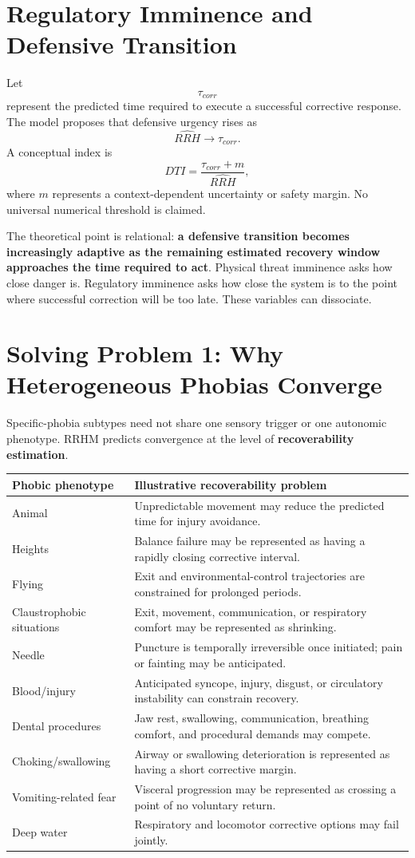 \documentclass[11pt]{article}
\begin{document}
\section{Regulatory Imminence and Defensive Transition}

Let
\[
\tau_{corr}
\]
represent the predicted time required to execute a successful corrective response. The model proposes that defensive urgency rises as
\[
\widehat{RRH}\rightarrow \tau_{corr}.
\]
A conceptual index is
\[
DTI=\frac{\tau_{corr}+m}{\widehat{RRH}},
\]
where $m$ represents a context-dependent uncertainty or safety margin. No universal numerical threshold is claimed.

The theoretical point is relational: \textbf{a defensive transition becomes increasingly adaptive as the remaining estimated recovery window approaches the time required to act}. Physical threat imminence asks how close danger is. Regulatory imminence asks how close the system is to the point where successful correction will be too late. These variables can dissociate.

\section{Solving Problem 1: Why Heterogeneous Phobias Converge}

Specific-phobia subtypes need not share one sensory trigger or one autonomic phenotype. RRHM predicts convergence at the level of \textbf{recoverability estimation}.

\begin{longtable}{p{}p{}}
\toprule
\textbf{Phobic phenotype} & \textbf{Illustrative recoverability problem} \\
\midrule
Animal & Unpredictable movement may reduce the predicted time for injury avoidance. \\
Heights & Balance failure may be represented as having a rapidly closing corrective interval. \\
Flying & Exit and environmental-control trajectories are constrained for prolonged periods. \\
Claustrophobic situations & Exit, movement, communication, or respiratory comfort may be represented as shrinking. \\
Needle & Puncture is temporally irreversible once initiated; pain or fainting may be anticipated. \\
Blood/injury & Anticipated syncope, injury, disgust, or circulatory instability can constrain recovery. \\
Dental procedures & Jaw rest, swallowing, communication, breathing comfort, and procedural demands may compete. \\
Choking/swallowing & Airway or swallowing deterioration is represented as having a short corrective margin. \\
Vomiting-related fear & Visceral progression may be represented as crossing a point of no voluntary return. \\
Deep water & Respiratory and locomotor corrective options may fail jointly. \\
\bottomrule
\end{longtable}
\end{document}
